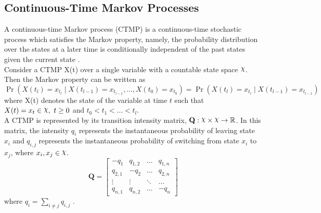 \subsection{Continuous-Time Markov Processes}
A continuous-time Markov process (CTMP) is a continuous-time stochastic process which satisfies the Markov property, namely, the probability distribution over the states at a later time is conditionally independent of the past states given the current state \cite{Cohn2010a}. \\
Consider a CTMP X(t) over a single variable with a countable state space $ \rchi $. Then the Markov property can be written as
\begin{equation}
\operatorname{Pr}\left(X(t_{l})=x_{t_{l}} \mid X(t_{l-1})=x_{t_{l-1}}, \ldots, X(t_{0})=x_{t_{0}}\right)=\operatorname{Pr}\left(X(t_{l})=x_{t_{l}} \mid X(t_{l-1})=x_{t_{l-1}}\right)
\end{equation}
where X(t) denotes the state of the variable at time $ t $ such that $ X(t)=x_t \in \rchi,\ t \geq 0$ and $ t_0<t_1<...<t_l $.\\
A CTMP is represented by its transition intensity matrix, $ \textbf{Q} : \rchi \times \rchi \rightarrow \mathbb{R}$. In this matrix, the intensity $ q_{i} $ represents the instantaneous probability of leaving state $ x_{i} $ and $ q_{i,j} $ represents the instantaneous probability of switching from state $ x_{i} $ to $ x_{j} $, where $ x_i, x_j \in \rchi $. 
\begin{equation}
\textbf{Q} = 
\begin{bmatrix}
-q_{1} & q_{1,2} &     {\hdots}  & q_{1,n} \\
q_{2,1} & -q_{2} &     {\hdots}  & q_{2,n}  \\
{\vdots}  &     {\vdots}  &     {\ddots}  & {\hdots}  \\
q_{n,1} &  q_{n,2} &  {\hdots} & -q_{n}
\end{bmatrix}
\label{eq:Q_matrix}
\end{equation}
where $ q_{i} = \sum_{i \neq j} q_{i,j}$ \cite{Nodelman1995}.


